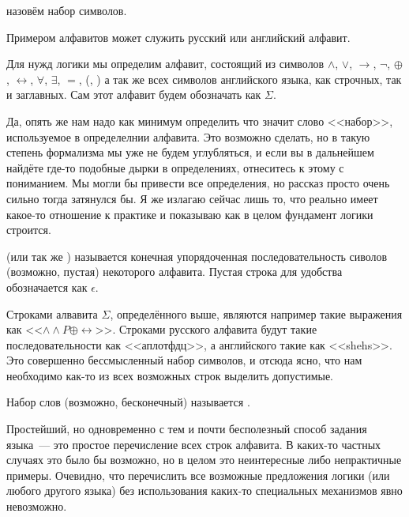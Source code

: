 \begin{definition}
 назовём набор символов.
\end{definition}

\begin{example}
Примером алфавитов может служить русский или английский алфавит.
\end{example}

\begin{example}
Для нужд логики мы определим алфавит, состоящий из символов $\land$, $\lor$, $\to$, $\neg$, $\oplus$, $\leftrightarrow$, $\forall$, $\exists$, $=$, (, ) а так же всех символов английского языка, как строчных, так и заглавных. Сам этот алфавит будем обозначать как $\Sigma$.
\end{example}

Да, опять же нам надо как минимум определить что значит слово <<набор>>, используемое в определелнии алфавита. Это возможно сделать, но в такую степень формализма мы уже не будем углубляться, и если вы в дальнейшем найдёте где-то подобные дырки в определениях, отнеситесь к этому с пониманием. Мы могли бы привести все определения, но рассказ просто очень сильно тогда затянулся бы. Я же излагаю сейчас лишь то, что реально имеет какое-то отношение к практике и показываю как в целом фундамент логики строится.

\begin{definition}
 (или так же ) называется конечная упорядоченная последовательность сиволов (возможно, пустая) некоторого алфавита. Пустая строка для удобства обозначается как $\epsilon$.
\end{definition}

Строками алвавита $\Sigma$, определённого выше, являются например такие выражения как <<$\land\land P\oplus\leftrightarrow$>>. Строками русского алфавита будут такие последовательности как <<аплотфдц>>, а английского такие как <<shehs>>. Это совершенно бессмысленный набор символов, и отсюда ясно, что нам необходимо как-то из всех возможных строк выделить допустимые.

\begin{definition}
Набор слов (возможно, бесконечный) называется .
\end{definition}

Простейший, но одновременно с тем и почти бесполезный способ задания языка~--- это простое перечисление всех строк алфавита. В каких-то частных случаях это было бы возможно, но в целом это неинтересные либо непрактичные примеры. Очевидно, что перечислить все возможные предложения логики (или любого другого языка) без использования каких-то специальных механизмов явно невозможно.

